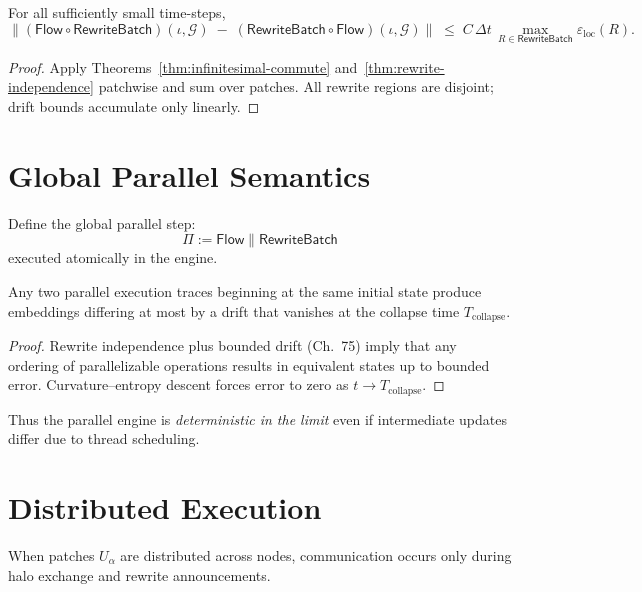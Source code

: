 \begin{theorem}
\label{thm:parallel-drift}
For all sufficiently small time-steps,
\[
  \bigl\|
     (\mathsf{Flow}\circ\mathsf{RewriteBatch})(\iota,\mathcal{G})
     \;-\;
     (\mathsf{RewriteBatch}\circ\mathsf{Flow})(\iota,\mathcal{G})
  \bigr\|
  \;\le\;
  C\,\Delta t\,\max_{R\in\mathsf{RewriteBatch}} \varepsilon_{\mathrm{loc}}(R).
\]
\end{theorem}

\begin{proof}
Apply Theorems~\ref{thm:infinitesimal-commute}
and~\ref{thm:rewrite-independence}
patchwise and sum over patches.  
All rewrite regions are disjoint; drift bounds accumulate only linearly.
\end{proof}

\section{Global Parallel Semantics}

Define the global parallel step:
\[
   \Pi := \mathsf{Flow} \parallel \mathsf{RewriteBatch}
\]
executed atomically in the engine.

\begin{theorem}
\label{thm:parallel-determinism}
Any two parallel execution traces beginning at the same initial state  
produce embeddings differing at most by a drift that vanishes at the
collapse time $T_{\mathrm{collapse}}$.
\end{theorem}

\begin{proof}
Rewrite independence plus bounded drift (Ch.~75) imply that any ordering of  
parallelizable operations results in equivalent states up to bounded error.  
Curvature–entropy descent forces error to zero as $t\to T_{\mathrm{collapse}}$.
\end{proof}

Thus the parallel engine is \emph{deterministic in the limit}
even if intermediate updates differ due to thread scheduling.

\section{Distributed Execution}

When patches $U_\alpha$ are distributed across nodes,
communication occurs only during halo exchange and rewrite announcements.

